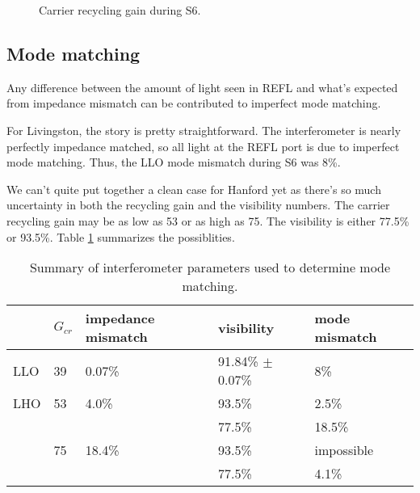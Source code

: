 \begin{figure}
\begin{centering}
\caption{Carrier recycling gain during S6.}
\label{fig:Gcr}
\end{centering}
\end{figure}



\subsection{Mode matching}
Any difference between the amount of light seen in REFL and what's expected from impedance mismatch 
can be contributed to imperfect mode matching.

For Livingston, the story is pretty straightforward. The interferometer is nearly perfectly impedance 
matched, so all light at the REFL port is due to imperfect mode matching. Thus, the LLO mode 
mismatch during S6 was 8\%.

We can't quite put together a clean case for Hanford yet as there's so much uncertainty in both the 
recycling gain and the visibility numbers. The carrier recycling gain may be as low as 53 or as high as 75. 
The visibility is either 77.5\% or 93.5\%. Table \ref{table:Gcr}
summarizes the possiblities.

\begin{table}
\centering
\begin{tabular}{l l l l l}
& $G_{cr}$ & impedance mismatch & visibility & mode mismatch\\
\hline\hline
LLO & 39 & 0.07\% & 91.84\% $\pm$ 0.07\% & 8\%\\
LHO & 53 & 4.0\% & 93.5\% & 2.5\% \\
       &      &            & 77.5\% & 18.5\% \\
       & 75 & 18.4\% & 93.5\% & impossible\\
       &      &             & 77.5\% & 4.1\% \\ 
\hline
\end{tabular}
\caption{Summary of interferometer parameters used to determine mode matching.}
\label{table:Gcr}
\end{table}
